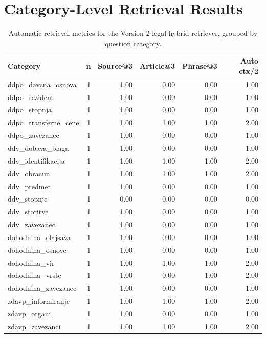 \documentclass[11pt,a4paper]{article}
\begin{document}
\section{Category-Level Retrieval Results}
\begin{table}[h]
\centering
\small
\begin{tabular}{lrrrrr}
\toprule
Category & n & Source@3 & Article@3 & Phrase@3 & Auto ctx/2 \\
\midrule
ddpo\_davcna\_osnova & 1 & 1.00 & 0.00 & 0.00 & 1.00 \\
ddpo\_rezident & 1 & 1.00 & 0.00 & 0.00 & 1.00 \\
ddpo\_stopnja & 1 & 1.00 & 0.00 & 0.00 & 1.00 \\
ddpo\_transferne\_cene & 1 & 1.00 & 1.00 & 1.00 & 2.00 \\
ddpo\_zavezanec & 1 & 1.00 & 0.00 & 0.00 & 1.00 \\
ddv\_dobava\_blaga & 1 & 1.00 & 0.00 & 0.00 & 1.00 \\
ddv\_identifikacija & 1 & 1.00 & 1.00 & 1.00 & 2.00 \\
ddv\_obracun & 1 & 1.00 & 1.00 & 1.00 & 2.00 \\
ddv\_predmet & 1 & 1.00 & 0.00 & 0.00 & 1.00 \\
ddv\_stopnje & 1 & 0.00 & 0.00 & 0.00 & 0.00 \\
ddv\_storitve & 1 & 1.00 & 0.00 & 0.00 & 1.00 \\
ddv\_zavezanec & 1 & 1.00 & 0.00 & 0.00 & 1.00 \\
dohodnina\_olajsava & 1 & 1.00 & 0.00 & 0.00 & 1.00 \\
dohodnina\_osnove & 1 & 1.00 & 0.00 & 0.00 & 1.00 \\
dohodnina\_vir & 1 & 1.00 & 1.00 & 1.00 & 2.00 \\
dohodnina\_vrste & 1 & 1.00 & 0.00 & 1.00 & 2.00 \\
dohodnina\_zavezanec & 1 & 1.00 & 0.00 & 0.00 & 1.00 \\
zdavp\_informiranje & 1 & 1.00 & 1.00 & 1.00 & 2.00 \\
zdavp\_organi & 1 & 1.00 & 0.00 & 0.00 & 1.00 \\
zdavp\_zavezanci & 1 & 1.00 & 1.00 & 1.00 & 2.00 \\
\bottomrule
\end{tabular}
\caption{Automatic retrieval metrics for the Version 2 legal-hybrid retriever, grouped by question category.}
\end{table}
\end{document}
